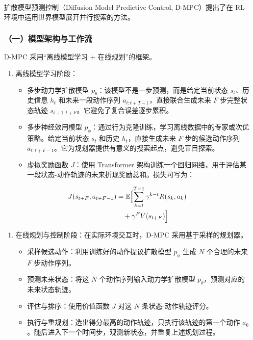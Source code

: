扩散模型预测控制（Diffusion Model Predictive Control, D-MPC）提出了在 RL 环境中运用世界模型展开并行搜索的方法。

\hypertarget{ux4e00ux6a21ux578bux67b6ux6784ux4e0eux5de5ux4f5cux6d41}{%
\subsubsection{（一）模型架构与工作流}\label{ux4e00ux6a21ux578bux67b6ux6784ux4e0eux5de5ux4f5cux6d41}}

D-MPC 采用``离线模型学习 + 在线规划''的框架。

\begin{enumerate}
\def\labelenumi{\arabic{enumi}.}
\tightlist
\item
  离线模型学习阶段：

  \begin{itemize}
  \tightlist
  \item
    多步动力学扩散模型 \(p_\theta\)：该模型不是一步预测，而是给定当前状态 \(s_t\)、历史信息 \(h_t\) 和未来一段动作序列 \(a_{t:t+T-1}\)，直接联合生成未来 \(F\) 步完整状态轨迹 \(s_{t+1:t+F}\)。它避免了复合误差逐步累积。
  \item
    多步神经效用模型 \(p_\phi\)：通过行为克隆训练，学习离线数据中的专家或次优策略。给定当前状态 \(s_t\) 和历史 \(h_t\)，直接生成未来 \(F\) 步的候选动作序列 \(a_{t:t+F-1}\)。它为规划器提供有意义的搜索起点，避免盲目探索。
  \item
    虚拟奖励函数 \(J\)：使用 Transformer 架构训练一个回归网络，用于评估某一段状态-动作轨迹的未来折现奖励总和。损失可写为：
  \end{itemize}
\end{enumerate}

\[
\begin{aligned}
J(s_{t+F}, a_{t+F-1})
&= \mathbb{E}\Bigl[
\sum_{k=t}^{T-1} \gamma^{k-t}
R(s_k, a_k)
\\
&\quad + \gamma^F V(s_{t+F})
\Bigr]
\end{aligned}
\]

\begin{enumerate}
\def\labelenumi{\arabic{enumi}.}
\setcounter{enumi}{1}
\tightlist
\item
  在线规划与控制阶段：在实际环境交互时，D-MPC 采用基于采样的规划器。

  \begin{itemize}
  \tightlist
  \item
    采样候选动作：利用训练好的动作提议扩散模型 \(p_\phi\) 生成 \(N\) 个合理的未来 \(F\) 步动作序列。
  \item
    预测未来状态：将这 \(N\) 个动作序列输入动力学扩散模型 \(p_\theta\)，预测对应的未来状态轨迹。
  \item
    评估与排序：使用价值函数 \(J\) 对这 \(N\) 条状态-动作轨迹评分。
  \item
    执行与重规划：选出得分最高的动作轨迹，只执行该轨迹的第一个动作 \(a_0\)。随后进入下一个时间步，观测新状态，并重复上述规划过程。
  \end{itemize}
\end{enumerate}


